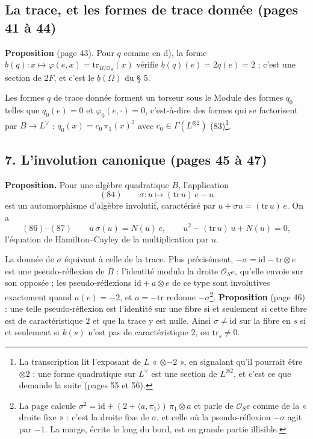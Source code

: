 \documentclass[11pt,a4paper]{article}
\begin{document}
\subsection*{La trace, et les formes de trace donnée (pages 41 à 44)}

\textbf{Proposition} (page 43). Pour $q$ comme en d), la forme $\underline{b}(q) :
x \mapsto \varphi(e, x) = \mathrm{tr}_{B/\mathcal{O}_S}(x)$ vérifie $\underline{b}(q)(e) =
2q(e) = 2$ ; c'est une section de $2F$, et c'est le $\underline{b}(\Omega)$ du § 5.

Les formes $q$ de trace donnée forment un torseur sous le Module des formes
$q_0$ telles que $q_0(e) = 0$ et $\varphi_0(e, \cdot) = 0$, c'est-à-dire des formes
qui se factorisent par $B \to L^{\vee}$ : $q_0(x) = c_0\,\pi_1(x)^2$ avec $c_0 \in
\Gamma(L^{\otimes 2})$ (83)\footnote{La transcription lit l'exposant de $L$
« $\otimes{-2}$ », en signalant qu'il pourrait être $\otimes 2$ : une forme
quadratique sur $L^{\vee}$ est une section de $L^{\otimes 2}$, et c'est ce que
demande la suite (pages 55 et 56).}.

\subsection*{7. L'involution canonique (pages 45 à 47)}

\textbf{Proposition.} Pour une algèbre quadratique $B$, l'application
\[
  (84) \qquad \sigma : u \mapsto (\mathrm{tr}\,u)\,e - u
\]
est un automorphisme d'algèbre involutif, caractérisé par $u + \sigma u =
(\mathrm{tr}\,u)\,e$. On a
\[
  (86)\text{--}(87) \qquad u\,\sigma(u) = N(u)\,e, \qquad u^2 - (\mathrm{tr}\,u)\,u +
  N(u) = 0,
\]
l'équation de Hamilton--Cayley de la multiplication par $u$.

La donnée de $\sigma$ équivaut à celle de la trace. Plus précisément,
$-\sigma = \mathrm{id} - \mathrm{tr} \otimes e$ est une pseudo-réflexion de $B$ : l'identité
modulo la droite $\mathcal{O}_S e$, qu'elle envoie sur son opposée ; les
pseudo-réflexions $\mathrm{id} + a \otimes e$ de ce type sont involutives exactement
quand $a(e) = -2$, et $a = -\mathrm{tr}$ redonne $-\sigma$\footnote{La page calcule
$\sigma^2 = \mathrm{id} + (2 + \langle a, \pi_1\rangle)\,\pi_1 \otimes a$ et parle de
$\mathcal{O}_S e$ comme de la « droite fixe » : c'est la droite fixe de $\sigma$, et
celle où la pseudo-réflexion $-\sigma$ agit par $-1$. La marge, écrite le long du
bord, est en grande partie illisible.}. \textbf{Proposition} (page 46) : une
telle pseudo-réflexion est l'identité sur une fibre si et seulement si cette
fibre est de caractéristique $2$ et que la trace y est nulle. Ainsi $\sigma \neq
\mathrm{id}$ sur la fibre en $s$ si et seulement si $k(s)$ n'est pas de
caractéristique $2$, ou $\mathrm{tr}_s \neq 0$.
\end{document}
